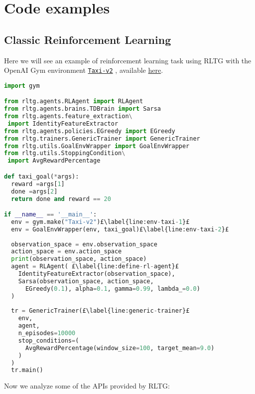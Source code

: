 \section{Code examples}
\subsection{Classic Reinforcement Learning}
Here we will see an example of reinforcement learning task using RLTG with the OpenAI Gym environment \href{https://gym.openai.com/envs/Taxi-v2/}{\texttt{Taxi-v2}} \citep{Dietterich98themaxq}, available \href{https://github.com/MarcoFavorito/rltg/blob/master/examples/taxi.py}{here}.
\begin{lstlisting}[style=Python, language=Python, escapechar=£, label={ex:rltg-classic-rl-example}, caption={Classic Reinforcement Learning using RLTG}]
import gym

from rltg.agents.RLAgent import RLAgent
from rltg.agents.brains.TDBrain import Sarsa
from rltg.agents.feature_extraction\
 import IdentityFeatureExtractor
from rltg.agents.policies.EGreedy import EGreedy
from rltg.trainers.GenericTrainer import GenericTrainer
from rltg.utils.GoalEnvWrapper import GoalEnvWrapper
from rltg.utils.StoppingCondition\
 import AvgRewardPercentage

def taxi_goal(*args):
  reward =args[1]
  done =args[2]
  return done and reward == 20

if __name__ == '__main__':
  env = gym.make("Taxi-v2")£\label{line:env-taxi-1}£ 
  env = GoalEnvWrapper(env, taxi_goal)£\label{line:env-taxi-2}£
  
  observation_space = env.observation_space
  action_space = env.action_space
  print(observation_space, action_space)
  agent = RLAgent( £\label{line:define-rl-agent}£
    IdentityFeatureExtractor(observation_space),
    Sarsa(observation_space, action_space, 
      EGreedy(0.1), alpha=0.1, gamma=0.99, lambda_=0.0)
  )
  
  tr = GenericTrainer(£\label{line:generic-trainer}£
    env, 
    agent, 
    n_episodes=10000
    stop_conditions=(
      AvgRewardPercentage(window_size=100, target_mean=9.0)
    )
  )
  tr.main()
\end{lstlisting}
Now we analyze some of the APIs provided by RLTG:
